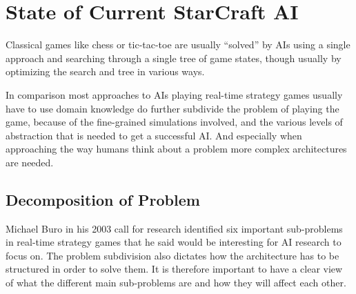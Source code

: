 
\section{State of Current StarCraft AI}
\label{sec:stateofai}

Classical games like chess or tic-tac-toe are usually ``solved'' by AIs using a
single approach and searching through a single tree of game states, though
usually by optimizing the search and tree in various ways.

In comparison most approaches to AIs playing real-time strategy games usually
have to use domain knowledge do further subdivide the problem of playing the
game, because of the fine-grained simulations involved, and the various levels
of abstraction that is needed to get a successful AI. And especially when
approaching the way humans think about a problem more complex architectures
are needed.

\subsection{Decomposition of Problem}
Michael Buro in his 2003 call for research \cite{buro2003real} identified six
important sub-problems in real-time strategy games that he said would be
interesting for AI research to focus on. The problem subdivision also dictates
how the architecture has to be structured in order to solve them. It is
therefore important to have a clear view of what the different main sub-problems
are and how they will affect each other.

